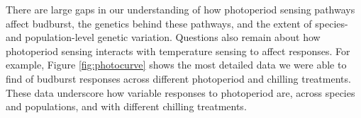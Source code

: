 \documentclass{article}
\begin{document}
\par There are large gaps in our understanding of how photoperiod sensing pathways affect budburst, the genetics behind these pathways, and the extent of species- and population-level genetic variation. Questions also remain about how photoperiod sensing interacts with temperature sensing to affect responses. For example, Figure \ref{fig:photocurve} shows the most detailed data we were able to find of budburst responses across different photoperiod and chilling treatments. These data underscore how variable responses to photoperiod are, across species and populations, and with different chilling treatments. 

\end{document}

